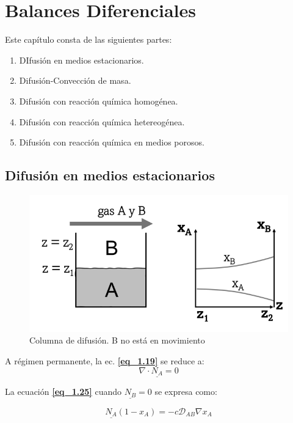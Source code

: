 \chapter{Balances Diferenciales}
Este capítulo consta de las siguientes partes:
\begin{enumerate}
	\item DIfusión en medios estacionarios.
	\item Difusión-Convección de masa.
	\item Difusión con reacción química homogénea.
	\item Difusión con reacción química hetereogénea.
	\item Difusión con reacción química en medios porosos.
\end{enumerate}

\section{Difusión en medios estacionarios}

\begin{figure}[H]
	\centering 
	\includegraphics[scale=0.5]{./Capitulo2/Imagenes/fig-2-1.png}
	\caption{Columna de difusión. B no está en movimiento}
\end{figure}

A régimen permanente, la ec. \textbf{\eqref{eq_1.19}} se reduce a:
\begin{equation}
\nabla \cdot \underline{N_A} = 0
\label{eq_2.1}
\end{equation}

La ecuación \textbf{\eqref{eq_1.25}} cuando $\underline{N_B} = 0$ se expresa como:

\begin{equation}
\underline{N_A} (1-x_A) = - c \mathscr{D}_{AB} \nabla x_A
\label{eq_2.2}
\end{equation}

